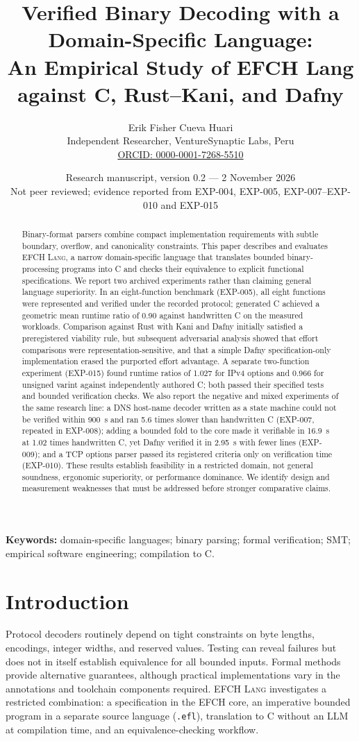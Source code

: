 \documentclass[10pt,twocolumn]{article}
\title{\vspace{-1em}\bfseries Verified Binary Decoding with a Domain-Specific Language:\\An Empirical Study of EFCH Lang against C, Rust--Kani, and Dafny}
\author{Erik Fisher Cueva Huari\\\small Independent Researcher, VentureSynaptic Labs, Peru\\\small \href{https://orcid.org/0000-0001-7268-5510}{ORCID: 0000-0001-7268-5510}}
\date{Research manuscript, version 0.2 --- 2 November 2026\\\small Not peer reviewed; evidence reported from EXP-004, EXP-005, EXP-007--EXP-010 and EXP-015}
\newcommand{\efch}{\textsc{EFCH Lang}}
\begin{document}
\maketitle
\begin{abstract}
Binary-format parsers combine compact implementation requirements with subtle boundary, overflow, and canonicality constraints. This paper describes and evaluates \efch{}, a narrow domain-specific language that translates bounded binary-processing programs into C and checks their equivalence to explicit functional specifications. We report two archived experiments rather than claiming general language superiority. In an eight-function benchmark (EXP-005), all eight functions were represented and verified under the recorded protocol; generated C achieved a geometric mean runtime ratio of 0.90 against handwritten C on the measured workloads. Comparison against Rust with Kani and Dafny initially satisfied a preregistered viability rule, but subsequent adversarial analysis showed that effort comparisons were representation-sensitive, and that a simple Dafny specification-only implementation erased the purported effort advantage. A separate two-function experiment (EXP-015) found runtime ratios of 1.027 for IPv4 options and 0.966 for unsigned varint against independently authored C; both passed their specified tests and bounded verification checks. We also report the negative and mixed experiments of the same research line: a DNS host-name decoder written as a state machine could not be verified within 900~s and ran 5.6 times slower than handwritten C (EXP-007, repeated in EXP-008); adding a bounded fold to the core made it verifiable in 16.9~s at 1.02 times handwritten C, yet Dafny verified it in 2.95~s with fewer lines (EXP-009); and a TCP options parser passed its registered criteria only on verification time (EXP-010). These results establish feasibility in a restricted domain, not general soundness, ergonomic superiority, or performance dominance. We identify design and measurement weaknesses that must be addressed before stronger comparative claims.
\end{abstract}
\noindent\textbf{Keywords:} domain-specific languages; binary parsing; formal verification; SMT; empirical software engineering; compilation to C.

\section{Introduction}
Protocol decoders routinely depend on tight constraints on byte lengths, encodings, integer widths, and reserved values. Testing can reveal failures but does not in itself establish equivalence for all bounded inputs. Formal methods provide alternative guarantees, although practical implementations vary in the annotations and toolchain components required. \efch{} investigates a restricted combination: a specification in the EFCH core, an imperative bounded program in a separate source language (\texttt{.efl}), translation to C without an LLM at compilation time, and an equivalence-checking workflow.
\end{document}
